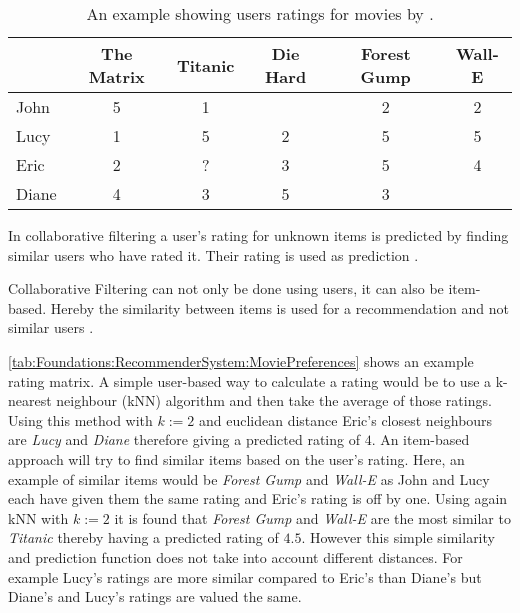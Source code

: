 \begin{table}[tb]
    \centering    
    \begin{tabular}{ l | c | c | c | c | c }
        & The Matrix & Titanic & Die Hard & Forest Gump & Wall-E \\ \hline
         John  & 5 & 1 &   & 2 & 2 \\
         Lucy  & 1 & 5 & 2 & 5 & 5 \\
         Eric  & 2 & ? & 3 & 5 & 4 \\
         Diane & 4 & 3 & 5 & 3 &   \\
    \end{tabular}
    \caption[Movies: Rating Matrix]{An example showing users ratings for movies by \citeauthor{ningComprehensiveSurveyNeighborhoodBased2015} \cite{ningComprehensiveSurveyNeighborhoodBased2015}.}  
    \label{tab:Foundations:RecommenderSystem:MoviePreferences}
\end{table}

In collaborative filtering a user's rating for unknown items is predicted by finding similar users who have rated it. Their rating is used as prediction \cite[~ pp. 7, 8]{felfernigDecisionTasksBasic2018}.

Collaborative Filtering can not only be done using users, it can also be item-based. Hereby the similarity between items is used for a recommendation and not similar users \cite{ricciRecommenderSystemsHandbook2015}.

\autoref{tab:Foundations:RecommenderSystem:MoviePreferences} shows an example rating matrix. A simple user-based way to calculate a rating would be to use a k-nearest neighbour (kNN) algorithm and then take the average of those ratings. Using this method with $k := 2$ and euclidean distance Eric's closest neighbours are \textit{Lucy} and \textit{Diane} therefore giving a predicted rating of $4$. An item-based approach will try to find similar items based on the user's rating. Here, an example of similar items would be \textit{Forest Gump} and \textit{Wall-E} as John and Lucy each have given them the same rating and Eric's rating is off by one. Using again kNN with $k := 2$ it is found that \textit{Forest Gump} and \textit{Wall-E} are the most similar to \textit{Titanic} thereby having a predicted rating of $4.5$. However this simple similarity and prediction function does not take into account different distances. For example Lucy's ratings are more similar compared to Eric's than Diane's but Diane's and Lucy's ratings are valued the same.

